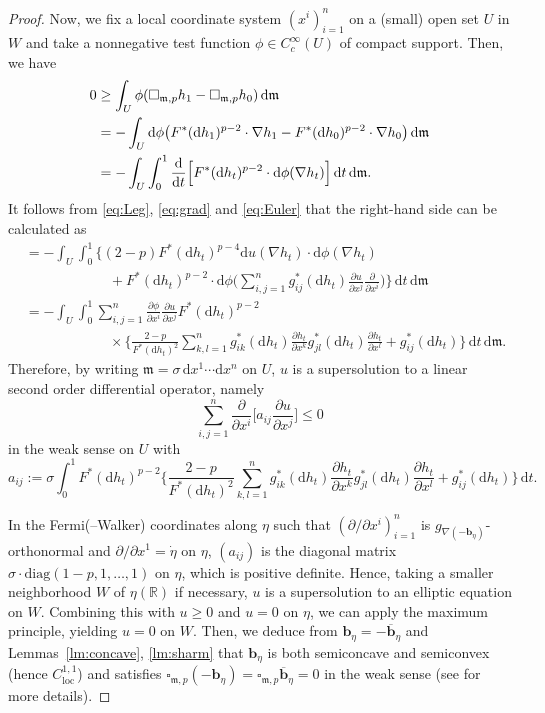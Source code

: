 \documentclass[a4paper,11pt]{article}
\numberwithin{equation}{section}
\theoremstyle{definition}
\theoremstyle{plain}
\newcommand{\del}{\partial}
\newcommand{\dd}{\mathrm{d}}
\newcommand{\R}{\ensuremath{\mathbb{R}}}
\newcommand{\fm}{\ensuremath{\mathfrak{m}}}
\newcommand{\bb}{\ensuremath{\mathbf{b}}}
\def\loc{\mathop{\mathrm{loc}}\nolimits}
\newcommand{\ol}[1]{\overline{#1}}
\begin{document}
\begin{proof}
Now, we fix a local coordinate system $(x^i)_{i=1}^n$ on a (small) open set $U$ in $W$ and take a nonnegative test function $\phi \in C^\infty_c(U)$ of compact support.
Then, we have
\begin{align*}
0 &\ge \int_U \phi (\square_{\fm,p} h_1 -\square_{\fm,p}h_0) \,\dd\fm \\
&= -\int_U \dd\phi \bigl( F^*(\dd h_1)^{p-2} \cdot \nabla h_1 -F^*(\dd h_0)^{p-2} \cdot \nabla h_0 \bigr) \,\dd\fm \\
&= -\int_U \int_0^1 \frac{\dd}{\dd t} \Bigl[ F^*(\dd h_t)^{p-2} \cdot \dd\phi(\nabla h_t) \Bigr] \,\dd t \,\dd\fm.
\end{align*}
It follows from \eqref{eq:Leg}, \eqref{eq:grad} and \eqref{eq:Euler} that the right-hand side can be calculated as
\begin{align*}
&= -\int_U \int_0^1 \biggl\{ (2-p)F^*(\dd h_t)^{p-4} \dd u(\nabla h_t) \cdot \dd\phi(\nabla h_t) \\
&\qquad\qquad\qquad
+F^*(\dd h_t)^{p-2} \cdot \dd\phi\biggl( \sum_{i,j=1}^n g^*_{ij}(\dd h_t)\frac{\del u}{\del x^j} \frac{\del}{\del x^i} \biggr) \biggr\} \,\dd t \,\dd\fm \\
&= -\int_U \int_0^1 \sum_{i,j=1}^n \frac{\del\phi}{\del x^i} \frac{\del u}{\del x^j} F^*(\dd h_t)^{p-2} \\
&\qquad\qquad\qquad
\times \biggl\{ \frac{2-p}{F^*(\dd h_t)^2} \sum_{k,l=1}^n g^*_{ik}(\dd h_t) \frac{\del h_t}{\del x^k} g^*_{jl}(\dd h_t) \frac{\del h_t}{\del x^l} +g^*_{ij}(\dd h_t) \biggr\} \,\dd t \,\dd\fm.
\end{align*}
Therefore, by writing $\fm=\sigma \,\dd x^1 \cdots \dd x^n$ on $U$, $u$ is a supersolution to a linear second order differential operator, namely
\[ \sum_{i,j=1}^n \frac{\del}{\del x^i}\biggl[ a_{ij} \frac{\del u}{\del x^j} \biggr] \le 0 \]
in the weak sense on $U$ with
\[ a_{ij} :=\sigma \int_0^1 F^*(\dd h_t)^{p-2} \biggl\{ \frac{2-p}{F^*(\dd h_t)^2} \sum_{k,l=1}^n g^*_{ik}(\dd h_t) \frac{\del h_t}{\del x^k} g^*_{jl}(\dd h_t) \frac{\del h_t}{\del x^l} +g^*_{ij}(\dd h_t) \biggr\} \,\dd t. \]

In the Fermi(--Walker) coordinates along $\eta$ such that $(\del/\del x^i)_{i=1}^n$ is $g_{\nabla(-\bb_\eta)}$-orthonormal and $\del/\del x^1=\dot{\eta}$ on $\eta$, $(a_{ij})$ is the diagonal matrix $\sigma \cdot \mathrm{diag}(1-p,1,\ldots,1)$ on $\eta$, which is positive definite.
Hence, taking a smaller neighborhood $W$ of $\eta(\R)$ if necessary, $u$ is a supersolution to an elliptic equation on $W$.
Combining this with $u \ge 0$ and $u=0$ on $\eta$, we can apply the maximum principle, yielding $u=0$ on $W$.
Then, we deduce from $\bb_\eta =-\ol{\bb}_\eta$ and Lemmas~\ref{lm:concave}, \ref{lm:sharm} that $\bb_\eta$ is both semiconcave and semiconvex (hence $C^{1,1}_{\loc}$) and satisfies $\square_{\fm,p}(-\bb_\eta) =\square_{\fm,p}\ol{\bb}_\eta =0$ in the weak sense (see \cite[Proposition~9]{quintet} for more details).
\end{proof}
\end{document}
